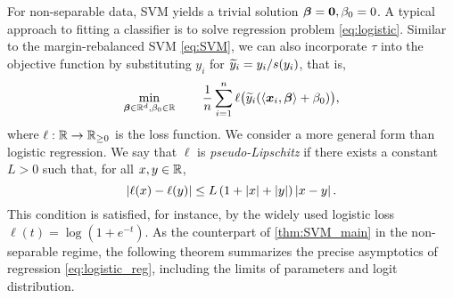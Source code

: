 For non-separable data, SVM yields a trivial solution ${\boldsymbol{\beta}}=\boldsymbol{0}, \beta_0 =0$. 
A typical approach to fitting a classifier is to solve regression problem \cref{eq:logistic}. Similar to the margin-rebalanced SVM \cref{eq:SVM}, we can also incorporate $\tau$ into the objective function by substituting $y_i$ for $\widetilde y_i = y_i/s(y_i)$, that is,
\begin{equation}\label{eq:logistic_reg}
    \min \limits_{{\boldsymbol{\beta}} \in \mathbb{R}^d, \beta_0 \in \mathbb{R}} \qquad 
    \frac1n \sum_{i=1}^n \ell \bigl( \widetilde y_i(\langle {\boldsymbol{x}}_i, {\boldsymbol{\beta}} \rangle + \beta_0) \bigr),
\end{equation}
where $\ell: \mathbb{R} \to \mathbb{R}_{\ge 0}$ is the loss function. We consider a more general form than logistic regression. We say that $\ell$ is \emph{pseudo-Lipschitz} if there exists a constant $L > 0$ such that, for all $x, y \in \mathbb{R}$,
\begin{equation*}
    \left|{ \ell(x) - \ell(y) }\right| \le L \left( 1 + \left|{ x }\right| + \left|{ y }\right| \right) \left|{ x - y }\right|.
\end{equation*}
This condition is satisfied, for instance, by the widely used logistic loss $\ell(t) = \log(1 + e^{-t})$. As the counterpart of \cref{thm:SVM_main} in the non-separable regime, the following theorem summarizes the precise asymptotics of regression \cref{eq:logistic_reg}, including the limits of parameters and logit distribution.

